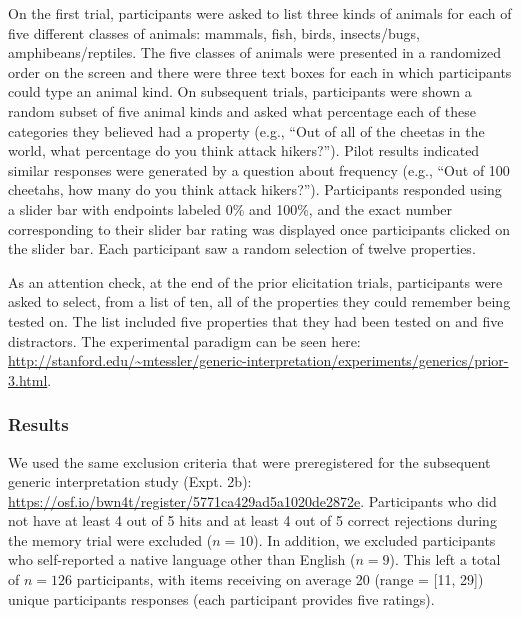 \documentclass[floatsintext,doc]{apa6}
\theoremstyle{definition}
\theoremstyle{definition}
\theoremstyle{definition}
\theoremstyle{remark}
\begin{document}
On the first trial, participants were asked to list three kinds of
animals for each of five different classes of animals: mammals, fish,
birds, insects/bugs, amphibeans/reptiles. The five classes of animals
were presented in a randomized order on the screen and there were three
text boxes for each in which participants could type an animal kind. On
subsequent trials, participants were shown a random subset of five
animal kinds and asked what percentage each of these categories they
believed had a property (e.g., \enquote{Out of all of the cheetas in the
world, what percentage do you think attack hikers?}). Pilot results
indicated similar responses were generated by a question about frequency
(e.g., \enquote{Out of 100 cheetahs, how many do you think attack
hikers?}). Participants responded using a slider bar with endpoints
labeled 0\% and 100\%, and the exact number corresponding to their
slider bar rating was displayed once participants clicked on the slider
bar. Each participant saw a random selection of twelve properties.


As an attention check, at the end of the prior elicitation trials,
participants were asked to select, from a list of ten, all of the
properties they could remember being tested on. The list included five
properties that they had been tested on and five distractors. The
experimental paradigm can be seen here:
\url{http://stanford.edu/~mtessler/generic-interpretation/experiments/generics/prior-3.html}.

\subsubsection{Results}\label{results-1}

We used the same exclusion criteria that were preregistered for the
subsequent generic interpretation study (Expt. 2b):
\url{https://osf.io/bwn4t/register/5771ca429ad5a1020de2872e}.
Participants who did not have at least 4 out of 5 hits and at least 4
out of 5 correct rejections during the memory trial were excluded
(\(n = 10\)). In addition, we excluded participants who self-reported a
native language other than English (\(n = 9\)). This left a total of
\(n = 126\) participants, with items receiving on average 20 (range =
{[}11, 29{]}) unique participants responses (each participant provides
five ratings).
\end{document}
